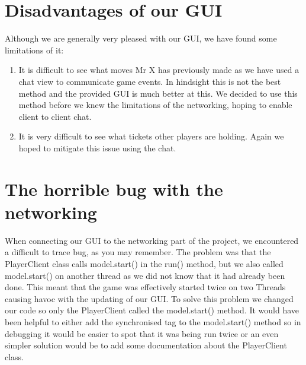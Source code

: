 \documentclass[a4paper, 12pt]{article}
\begin{document}
\section{Disadvantages of our GUI}
Although we are generally very pleased with our GUI, we have found some limitations of it:
\begin{enumerate}
	\item It is difficult to see what moves Mr X has previously made as we have used a chat view to communicate game events. In hindsight this is not the best method and the provided GUI is much better at this. We decided to use this method before we knew the limitations of the networking, hoping to enable client to client chat.
	\item It is very difficult to see what tickets other players are holding. Again we hoped to mitigate this issue using the chat.
\end{enumerate}
\section{The horrible bug with the networking}
When connecting our GUI to the networking part of the project, we encountered a difficult to trace bug, as you may remember. The problem was that the PlayerClient class calls model.start() in the run() method, but we also called model.start() on another thread as we did not know that it had already been done. This meant that the game was effectively started twice on two Threads causing havoc with the updating of our GUI. To solve this problem we changed our code so only the PlayerClient called the model.start() method. It would have been helpful to either add the synchronised tag to the model.start() method so in debugging it would be easier to spot that it was being run twice or an even simpler solution would be to add some documentation about the PlayerClient class.
\end{document}
